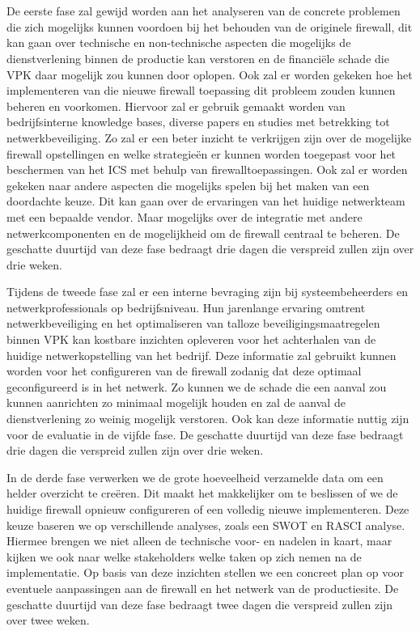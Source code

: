 \chapter{}%
\label{ch:methodologie}

De eerste fase zal gewijd worden aan het analyseren van de concrete problemen die zich mogelijks kunnen voordoen bij het behouden van de originele firewall, dit kan gaan over technische en non-technische aspecten die mogelijks de dienstverlening binnen de productie kan verstoren en de financiële schade die VPK daar mogelijk zou kunnen door oplopen. Ook zal er worden gekeken hoe het implementeren van die nieuwe firewall toepassing dit probleem zouden kunnen beheren en voorkomen. Hiervoor zal er gebruik gemaakt worden van bedrijfsinterne knowledge bases, diverse papers en studies met betrekking tot netwerkbeveiliging. Zo zal er een beter inzicht te verkrijgen zijn over de mogelijke firewall opstellingen en welke strategieën er kunnen worden toegepast voor het beschermen van het ICS met behulp van firewalltoepassingen. Ook zal er worden gekeken naar andere aspecten die mogelijks spelen bij het maken van een doordachte keuze. Dit kan gaan over de ervaringen van het huidige netwerkteam met een bepaalde vendor. Maar mogelijks over de integratie met andere netwerkcomponenten en de mogelijkheid om de firewall centraal te beheren. De geschatte duurtijd van deze fase bedraagt drie dagen die verspreid zullen zijn over drie weken.


Tijdens de tweede fase zal er een interne bevraging zijn bij systeembeheerders en netwerkprofessionals op bedrijfsniveau. Hun jarenlange ervaring omtrent netwerkbeveiliging en het optimaliseren van talloze beveiligingsmaatregelen binnen VPK kan kostbare inzichten opleveren voor het achterhalen van de huidige netwerkopstelling van het bedrijf. Deze informatie zal gebruikt kunnen worden voor het configureren van de firewall zodanig dat deze optimaal geconfigureerd is in het netwerk. Zo kunnen we de schade die een aanval zou kunnen aanrichten zo minimaal mogelijk houden en zal de aanval de dienstverlening zo weinig mogelijk verstoren. Ook kan deze informatie nuttig zijn voor de evaluatie in de vijfde fase. De geschatte duurtijd van deze fase bedraagt drie dagen die verspreid zullen zijn over drie weken.

In de derde fase verwerken we de grote hoeveelheid verzamelde data om een helder overzicht te creëren. Dit maakt het makkelijker om te beslissen of we de huidige firewall opnieuw configureren of een volledig nieuwe implementeren. Deze keuze baseren we op verschillende analyses, zoals een SWOT en RASCI analyse. Hiermee brengen we niet alleen de technische voor- en nadelen in kaart, maar kijken we ook naar welke stakeholders welke taken op zich nemen na de implementatie. Op basis van deze inzichten stellen we een concreet plan op voor eventuele aanpassingen aan de firewall en het netwerk van de productiesite. De geschatte duurtijd van deze fase bedraagt twee dagen die verspreid zullen zijn over twee weken.

